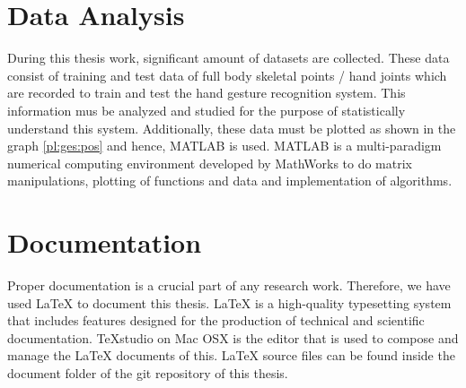 \section*{Data Analysis} During this thesis work, significant amount of datasets are collected. These data consist of training and test data of full body skeletal points / hand joints which are recorded to train and test the hand gesture recognition system. This information mus be analyzed and studied for the purpose of statistically understand this system. Additionally, these data must be plotted as shown in the graph \ref{pl:ges:pos} and hence, MATLAB is used. MATLAB is a multi-paradigm numerical computing environment developed by MathWorks to do matrix manipulations, plotting of functions and data and implementation of algorithms. 

\section*{Documentation} Proper documentation is a crucial part of any research work. Therefore, we have used LaTeX to document this thesis. LaTeX is a high-quality typesetting system that includes features designed for the production of technical and scientific documentation. TeXstudio on Mac OSX is the editor that is used to compose and manage the LaTeX documents of this. LaTeX source files can be found inside the document folder of the git repository of this thesis.
